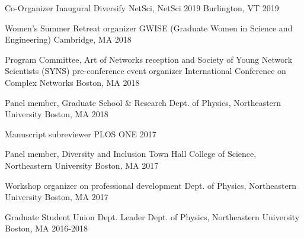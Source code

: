 \begin{cvhonors}
\cvhonor
	{Co-Organizer} %
	{Inaugural Diversify NetSci, NetSci 2019} %
	{Burlington, VT} %
	{2019} %

\cvhonor
	{Women's Summer Retreat organizer} %
	{GWISE (Graduate Women in Science and Engineering)} %
	{Cambridge, MA} %
	{2018} %

  \cvhonor
    {Program Committee, Art of Networks reception and Society of Young Network Scientists (SYNS) pre-conference event organizer} %
    {International Conference on Complex Networks} %
    {Boston, MA} %
    {2018} %
    
\cvhonor
	{Panel member, Graduate School \& Research} %
	{Dept. of Physics, Northeastern University} %
	{Boston, MA} %
	{2018} %
    

\cvhonor
	{Manuscript subreviewer} %
	{PLOS ONE} %
	{} %
	{2017} %

  \cvhonor
    {Panel member, Diversity and Inclusion Town Hall} %
    {College of Science, Northeastern University} %
    {Boston, MA} %
    {2017} %
    
  \cvhonor
    {Workshop organizer on professional development} %
    {Dept. of Physics, Northeastern University} %
    {Boston, MA} %
    {2017} %

  \cvhonor
    {Graduate Student Union Dept. Leader} %
    {Dept. of Physics, Northeastern University} %
    {Boston, MA} %
    {2016-2018} %
     

\end{cvhonors}
